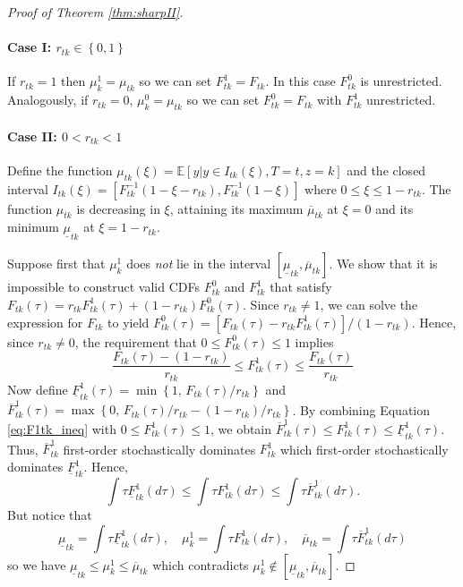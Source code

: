 \begin{proof}[Proof of Theorem \ref{thm:sharpII}]
\paragraph{Case I: $r_{tk}\in \left\{ 0,1 \right\}$}
If $r_{tk} = 1$ then $\mu^1_k = \mu_{tk}$ so we can set $F^1_{tk} = F_{tk}$.
In this case $F^0_{tk}$ is unrestricted.
Analogously, if $r_{tk} = 0$, $\mu^0_k = \mu_{tk}$ so we can set $F^0_{tk} = F_{tk}$ with $F^1_{tk}$ unrestricted.

\paragraph{Case II: $0 < r_{tk} < 1$} 
Define the function $\mu_{tk}(\xi) = \mathbb{E}[y|y\in I_{tk}(\xi), T=t, z=k]$ and the closed interval $I_{tk}(\xi) = \left[ F^{-1}_{tk}(1 - \xi - r_{tk}), F^{-1}_{tk}(1 - \xi) \right]$ where $0 \leq \xi \leq 1 - r_{tk}$.
The function $\mu_{tk}$ is decreasing in $\xi$,  attaining its maximum $\overline{\mu}_{tk}$ at $\xi = 0$ and its minimum $\underline{\mu}_{tk}$ at $\xi = 1 - r_{tk}$.

Suppose first that $\mu^1_{k}$ does \emph{not} lie in the interval $[\underline{\mu}_{tk}, \overline{\mu}_{tk}]$.
We show that it is impossible to construct valid CDFs $F^0_{tk}$ and $F^{1}_{tk}$ that satisfy $F_{tk}(\tau) = r_{tk} F^1_{tk}(\tau) + (1 - r_{tk}) F^0_{tk}(\tau)$.
Since $r_{tk} \neq 1$, we can solve the expression for $F_{tk}$ to yield 
  $F^{0}_{tk}(\tau) = \left[ F_{tk}(\tau) - r_{tk} F^1_{tk}(\tau)\right] / (1 - r_{tk})$.
  Hence, since $r_{tk} \neq 0$, the requirement that $0 \leq F_{tk}^0(\tau) \leq 1$ implies
\begin{equation}
  \frac{F_{tk}(\tau) - (1 - r_{tk})}{r_{tk}} \leq F^{1}_{tk}(\tau) \leq \frac{F_{tk}(\tau)}{r_{tk}}
  \label{eq:F1tk_ineq}
\end{equation}
Now define $\underline{F}^{1}_{tk}(\tau) =  \min\left\{ 1,\,  F_{tk}(\tau)/r_{tk} \right\}$ and 
$\overline{F}^{1}_{tk}(\tau) = \max\left\{ 0,\,  F_{tk}(\tau)/r_{tk} - (1 - r_{tk})/r_{tk} \right\}$.
By combining Equation \ref{eq:F1tk_ineq} with $0 \leq F^{1}_{tk}(\tau) \leq 1$, we obtain $\overline{F}_{tk}^1(\tau) \leq F^{1}_{tk}(\tau) \leq \underline{F}_{tk}^1(\tau)$.
Thus, $\overline{F}^1_{tk}$ first-order stochastically dominates $F^{1}_{tk}$ which first-order stochastically dominates $\underline{F}_{tk}^1$. 
Hence,
\[
 \int \tau \underline{F}_{tk}^1(d\tau) \leq \int \tau F^{1}_{tk}(d\tau) \leq \int \tau\overline{F}_{tk}^1(d\tau).
\]
But notice that 
\[
  \underline{\mu}_{tk} = \int \tau \underline{F}_{tk}^1(d\tau), \quad 
  \mu^1_{k} = \int \tau F^{1}_{tk}(d\tau), \quad 
  \overline{\mu}_{tk} = \int \tau\overline{F}_{tk}^1(d\tau)
\]
so we have $\underline{\mu}_{tk} \leq \mu^1_{k} \leq \overline{\mu}_{tk}$ which contradicts $\mu^1_{k} \notin [\underline{\mu}_{tk}, \overline{\mu}_{tk}]$.


\end{proof}

